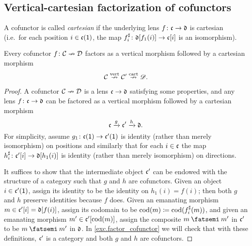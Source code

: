 \documentclass[Book-Poly]{subfiles}
\begin{document}

\subsection{Vertical-cartesian factorization of cofunctors}

A cofunctor is called \emph{cartesian} if the underlying lens $f\colon\mathfrak{c}\to\mathfrak{d}$ is cartesian (i.e.\ for each position $i\in\mathfrak{c}(\textsf{1})$, the map $f^\sharp_i\colon\mathfrak{d}[f_1(i)]\to\mathfrak{c}[i]$ is an isomorphism). %

\begin{proposition}\label{prop.factor_cofunctor}
Every cofunctor $f\colon\mathcal{C}\nrightarrow\mathcal{D}$ factors as a vertical morphism followed by a cartesian morphism
\[
\mathcal{C}\overset{\text{vert}}{\nrightarrow}\mathcal{C}'\overset{\text{cart}}{\nrightarrow}\mathscr{D}.
\]
\end{proposition}
\begin{proof}
A cofunctor $\mathcal{C}\nrightarrow\mathcal{D}$ is a lens $\mathfrak{c}\to\mathfrak{d}$ satisfying some properties, and any lens $f\colon\mathfrak{c}\to\mathfrak{d}$ can be factored as a vertical morphism followed by a cartesian morphism
\[
	\mathfrak{c}\xrightarrow{g}\mathfrak{c'}\xrightarrow{h}\mathfrak{d}.
\]
For simplicity, assume $g_1\colon\mathfrak{c}(\textsf{1})\to\mathfrak{c'}(\textsf{1})$ is identity (rather than merely isomorphism) on positions and similarly that for each $i\in\mathfrak{c}$ the map $h^\sharp_i\colon\mathfrak{c'}[i]\to\mathfrak{d}[h_1(i)]$ is identity (rather than merely isomorphism) on directions.

It suffices to show that the intermediate object $\mathfrak{c'}$ can be endowed with the structure of a category such that $g$ and $h$ are cofunctors. Given an object $i\in\mathfrak{c'}(\textsf{1})$, assign its identity to be the identity on $h_1(i)=f(i)$; then both $g$ and $h$ preserve identities because $f$ does. Given an emanating morphism $m\in\mathfrak{c'}[i]=\mathfrak{d}[f(i)]$, assign its codomain to be $\operatorname{cod}(m)\coloneqq\operatorname{cod}(f^\sharp_i(m))$, and given an emanating morphism $m'\in\mathfrak{c'}[\operatorname{cod}(m)]$, assign the composite $m\then m'$ in $\mathfrak{c'}$ to be $m\then m'$ in $\mathfrak{d}$. In \cref{exc.factor_cofunctor} we will check that with these definitions, $\mathfrak{c'}$ is a category and both $g$ and $h$ are cofunctors.
\end{proof}
\end{document}
